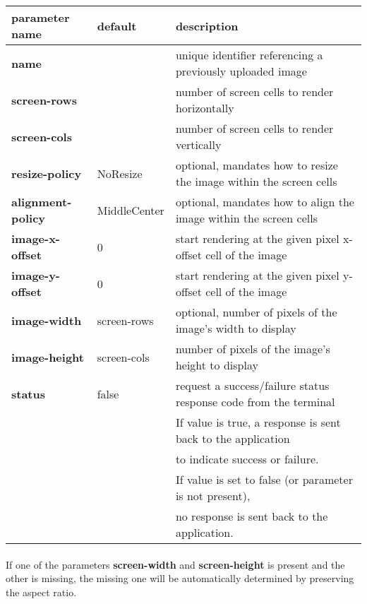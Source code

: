 \documentclass[a4paper]{article}
\begin{document}
\begin{tabular}{|l|l|l|}
    \hline
    \textbf{parameter name} & \textbf{default} & \textbf{description} \\
    \hline
    \textbf{name} &           & unique identifier referencing a previously uploaded image \\
    \textbf{screen-rows} &    & number of screen cells to render horizontally \\
    \textbf{screen-cols} &    & number of screen cells to render vertically \\
    \textbf{resize-policy} & NoResize & optional, mandates how to resize the image within the screen cells \\
    \textbf{alignment-policy} & MiddleCenter & optional, mandates how to align the image within the screen cells \\
    \textbf{image-x-offset} & 0 & start rendering at the given pixel x-offset cell of the image \\
    \textbf{image-y-offset} & 0 & start rendering at the given pixel y-offset cell of the image \\
    \textbf{image-width}    & screen-rows & optional, number of pixels of the image's width to display \\
    \textbf{image-height}   & screen-cols & number of pixels of the image's height to display \\
    \textbf{status}         & false & request a success/failure status response code from the terminal \\
        & & If value is true, a response is sent back to the application \\
        & & to indicate success or failure. \\
        & & If value is set to false (or parameter is not present), \\
        & & no response is sent back to the application. \\
    \hline
\end{tabular}


\paragraph*{}
If one of the parameters \textbf{screen-width} and \textbf{screen-height} is present and the other is
missing, the missing one will be automatically determined by preserving the aspect ratio.
\end{document}
